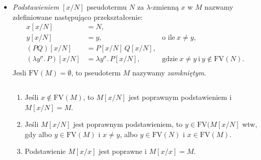 \begin{definicja}
\begin{itemize}
  \item \emph{Podstawieniem} \([x/N]\) pseudotermu \(N\) za \(\lambda\)-zmienną \(x\) w \(M\) nazwamy zdefiniowane następująco przekształcenie:
  \begin{align*}
    x[x/N] &= N,\\
    y[x/N] &= y,\ &\text{o ile}\ x\neq y,\\
    (PQ)[x/N] &= P[x/N]\,Q[x/N],\\
    (\lambda y^\sigma.\, P)[x/N] &= \lambda y^\sigma .\,P[x/N],\ &\text{gdzie}\ x\neq y\ \text{i}\ y\not\in \mathrm{FV}(N).\\
  \end{align*}
    Jesli \(\mathrm{FV}(M)=\emptyset\), to pseudoterm \(M\) nazywamy \emph{zamkniętym}. 
    \begin{fakt}$ $\\
      \begin{enumerate}[label=({\alph*})]
        \item Jeśli \(x\not\in\mathrm{FV}(M)\), to \(M[x/N]\) jest poprawnym podstawieniem i \(M[x/N]=M\).
        \item Jeśli \(M[x/N]\) jest poprawnym podstawieniem, to \(y\in\mathrm{FV}(M[x/N]\) wtw, gdy albo \(y\in\mathrm{FV}(M)\)
          i \(x\neq y\), albo \(y\in \mathrm{FV}(N)\) i \(x\in \mathrm{FV}(M)\). 
        \item Podstawienie \(M[x/x]\) jest poprawne i \(M[x/x]=M\).

\end{enumerate}
\end{fakt}
\end{itemize}
\end{definicja}
